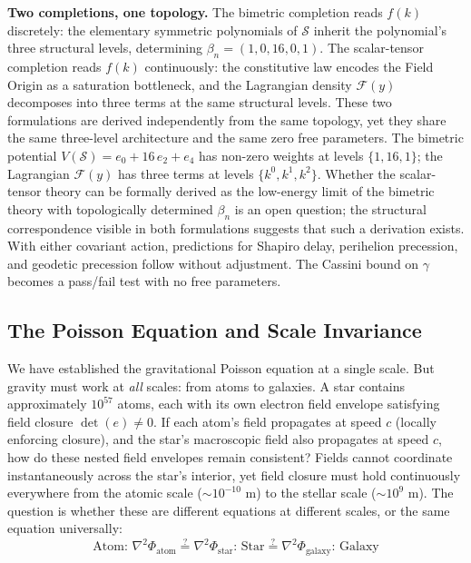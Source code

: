 \documentclass[aps,prd,preprint,superscriptaddress,showpacs,preprintnumbers,amsmath,amssymb,nofootinbib]{revtex4-2}
\begin{document}
\textbf{Two completions, one topology.} The bimetric completion reads $f(k)$ discretely: the elementary symmetric polynomials of $\mathcal{S}$ inherit the polynomial's three structural levels, determining $\beta_n = (1, 0, 16, 0, 1)$. The scalar-tensor completion reads $f(k)$ continuously: the constitutive law encodes the Field Origin as a saturation bottleneck, and the Lagrangian density $\mathcal{F}(y)$ decomposes into three terms at the same structural levels. These two formulations are derived independently from the same topology, yet they share the same three-level architecture and the same zero free parameters. The bimetric potential $V(\mathcal{S}) = e_0 + 16\,e_2 + e_4$ has non-zero weights at levels $\{1, 16, 1\}$; the Lagrangian $\mathcal{F}(y)$ has three terms at levels $\{k^0, k^1, k^2\}$. Whether the scalar-tensor theory can be formally derived as the low-energy limit of the bimetric theory with topologically determined $\beta_n$ is an open question; the structural correspondence visible in both formulations suggests that such a derivation exists. With either covariant action, predictions for Shapiro delay, perihelion precession, and geodetic precession follow without adjustment. The Cassini bound on $\gamma$ becomes a pass/fail test with no free parameters.

\subsection{The Poisson Equation and Scale Invariance}
\label{subsec:poisson-scale-invariance}


We have established the gravitational Poisson equation at a single scale. But gravity must work at \emph{all} scales: from atoms to galaxies. A star contains approximately $10^{57}$ atoms, each with its own electron field envelope satisfying field closure $\det(e) \neq 0$. If each atom's field propagates at speed $c$ (locally enforcing closure), and the star's macroscopic field also propagates at speed $c$, how do these nested field envelopes remain consistent? Fields cannot coordinate instantaneously across the star's interior, yet field closure must hold continuously everywhere from the atomic scale ($\sim 10^{-10}$ m) to the stellar scale ($\sim 10^9$ m). The question is whether these are different equations at different scales, or the same equation universally:
\begin{equation}
\text{Atom: } \nabla^2\Phi_{\text{atom}} \stackrel{?}{=} \nabla^2\Phi_{\text{star}} \text{: Star} \stackrel{?}{=} \nabla^2\Phi_{\text{galaxy}} \text{: Galaxy}
\label{eq:scaling-question}
\end{equation}
\end{document}
